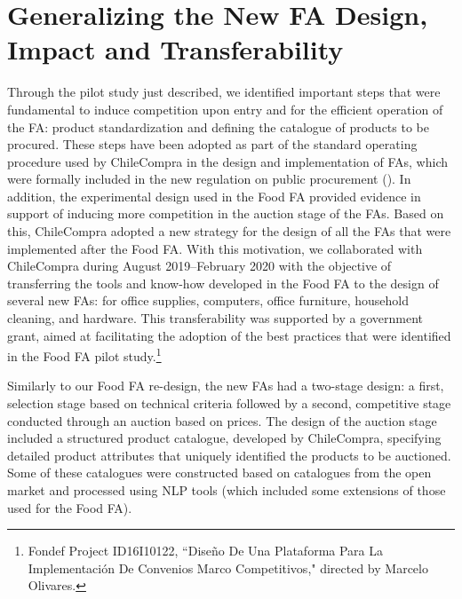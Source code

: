 \section{{Generalizing the New FA Design, Impact and Transferability}}


 
 Through the pilot study just described, we identified important steps that were fundamental to induce competition upon entry and for the efficient operation of the FA:  product standardization and defining the catalogue of products to be procured. These steps have been adopted as part of the standard operating procedure used by ChileCompra in the design and implementation of FAs, which were formally included in the new regulation on public procurement (\cite{leycompras}). In addition, the experimental design used in the Food FA provided evidence in support of inducing more competition in the auction stage of the FAs. Based on this, ChileCompra adopted a new strategy for the design of all the FAs that were implemented after the Food FA.
 With this motivation, we collaborated with ChileCompra during August 2019--February 2020 with the objective of transferring the tools and know-how developed in the Food FA to the design of several new FAs: for office supplies, computers, office furniture, household cleaning, and hardware. This transferability was supported by a government grant, aimed at facilitating the adoption of the best practices that were identified in the Food FA pilot study.\footnote{Fondef Project ID16I10122, ``Diseño De Una Plataforma Para La Implementación De Convenios Marco Competitivos," directed by Marcelo Olivares.}

Similarly to our Food FA re-design, the new FAs had a two-stage design: a first, selection stage based on technical criteria followed by a second, competitive stage conducted through an auction based on prices. 
The design of the auction stage included a structured product catalogue, developed by ChileCompra, specifying detailed product attributes that uniquely identified the products to be auctioned. Some of these catalogues were constructed based on catalogues from the open market and processed using NLP tools (which included some extensions of those used for the Food FA). 

